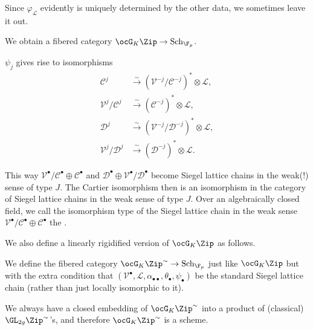 \documentclass[a4paper]{scrartcl} %
\numberwithin{equation}{section}
\begin{document}
\begin{Definition}
  Since $\varphi_{\mathcal{L}}$ evidently is uniquely determined by the other data, we sometimes leave it out.

  We obtain a fibered category $\ocG_K\Zip \to \mathrm{Sch}_{\F_p}$.
\end{Definition}


\begin{Remark}\label{psi-rise}
  $\psi_j$ gives rise to isomorphisms
  \begin{align*}
    \mathcal{C}^j &\xrightarrow{\sim} (\mathcal{V}^{-j}/\mathcal{C}^{-j})^*\otimes\mathcal{L}, \\
    \mathcal{V}^j/\mathcal{C}^j &\xrightarrow{\sim} (\mathcal{C}^{-j})^*\otimes\mathcal{L}, \\
    \mathcal{D}^j &\xrightarrow{\sim} (\mathcal{V}^{-j}/\mathcal{D}^{-j})^*\otimes\mathcal{L}, \\
    \mathcal{V}^j/\mathcal{D}^j &\xrightarrow{\sim} (\mathcal{D}^{-j})^*\otimes\mathcal{L}.
  \end{align*}

  This way $\mathcal{V}^\bullet/\mathcal{C}^\bullet\oplus \mathcal{C}^\bullet$ and $\mathcal{D}^\bullet\oplus \mathcal{V}^\bullet/\mathcal{D}^\bullet$ become Siegel lattice chains in the weak(!) sense of type $J$.  The Cartier isomorphism then is an isomorphism in the category of Siegel lattice chains in the weak sense of type $J$. Over an algebraically closed field, we call the isomorphism type of the Siegel lattice chain in the weak sense $\mathcal{V}^\bullet/\mathcal{C}^\bullet\oplus \mathcal{C}^\bullet$ the .
\end{Remark}


We also define a linearly rigidified version of $\ocG_K\Zip$ as follows.

\begin{Definition}
  We define the fibered category $\ocG_K\Zip^{\sim}\to \mathrm{Sch}_{\F_p}$ just like $\ocG_K\Zip$ but with the extra condition that $(\mathcal{V}^\bullet,\mathcal{L},\alpha_{\bullet\bullet},\theta_\bullet,\psi_\bullet)$ be the standard Siegel lattice chain (rather than just locally isomorphic to it).
\end{Definition}


\begin{Lemma}\label{GKZipEmb}
  We always have a closed embedding of $\ocG_K\Zip^{\sim}$ into a product of (classical) $\GL_{2g}\Zip^{\sim}$'s, and therefore $\ocG_K\Zip^{\sim}$ is a scheme.
\end{Lemma}
\end{document}
